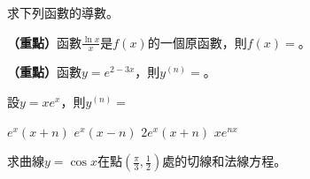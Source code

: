 \documentclass[12pt, addpoints]{exam}
\def \important{\textbf{（重點）}}
\begin{document}
\begin{questions}
\newpage %

\question
求下列函數的導數。


\newpage %

\question[1]
\important 函數$\displaystyle \frac{\ln x}{x}$是$f(x)$的一個原函數，則$f(x)=$\fillin[Blank]。

\question[1]
\important 函數$y=e^{2-3x}$，則$y^{(n)}=$\fillin[Blank]。

\question[1]
設$y=xe^x$，則$y^{(n)}=$
\begin{choices}
    \choice $\displaystyle e^x(x+n)$
    \choice $\displaystyle e^x(x-n)$
    \choice $\displaystyle 2e^x(x+n)$
    \choice $\displaystyle xe^{nx}$
\end{choices}

\question[1]
求曲線$y=\cos x$在點$\displaystyle \left( \frac{\pi}{3}, \frac{1}{2} \right)$處的切線和法線方程。

\end{questions}

\newpage %
\end{document}
